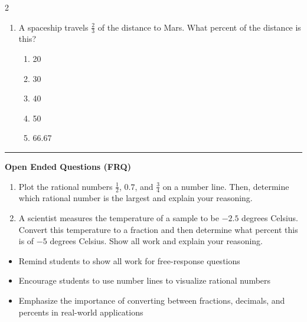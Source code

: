 \documentclass[10pt]{article}
\begin{document}
\begin{multicols}{2}
\begin{enumerate}[label=\textbf{Q\arabic*.}, leftmargin=*, itemsep=6pt, parsep=0pt]
  \item \small A spaceship travels $\frac{2}{3}$ of the distance to Mars. What percent of the distance is this?
  \begin{enumerate}[label=(\Alph*), leftmargin=0.6cm, nosep, itemsep=2pt]
    \item 20%
    \item 30%
    \item 40%
    \item 50%
    \item 66.67%
  \end{enumerate}

\end{enumerate}
\end{multicols}

\vspace{-0.2cm}
\hrule
\vspace{0.2cm}
\textbf{\small Open Ended Questions (FRQ)}
\begin{enumerate}[label=\textbf{Q\arabic*.}, start=9, itemsep=5pt, topsep=0pt]

  \item \small Plot the rational numbers $\frac{1}{2}$, $0.7$, and $\frac{3}{4}$ on a number line. Then, determine which rational number is the largest and explain your reasoning. \vspace{2cm}

  \item \small A scientist measures the temperature of a sample to be $-2.5$ degrees Celsius. Convert this temperature to a fraction and then determine what percent this is of $-5$ degrees Celsius. Show all work and explain your reasoning. \vspace{2cm}

\end{enumerate}

\vfill

\begin{tcolorbox}[colback=blue!5, colframe=mainblue!50, title=\small \textbf{Chef's Tips}, fonttitle=\bfseries, bottom=1mm]
\begin{itemize}[noitemsep, topsep=2pt, leftmargin=0.5cm]
  \item \scriptsize Remind students to show all work for free-response questions\item \scriptsize Encourage students to use number lines to visualize rational numbers\item \scriptsize Emphasize the importance of converting between fractions, decimals, and percents in real-world applications
\end{itemize}
\end{tcolorbox}
\end{document}
